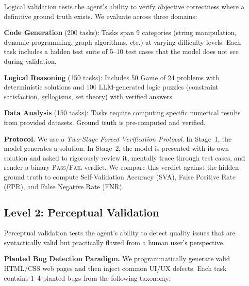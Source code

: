 \documentclass[11pt]{fairmeta}
\begin{document}
Logical validation tests the agent's ability to verify objective correctness where a definitive ground truth exists. We evaluate across three domains:

\textbf{Code Generation} (200 tasks): Tasks span 9 categories (string manipulation, dynamic programming, graph algorithms, etc.) at varying difficulty levels. Each task includes a hidden test suite of 5--10 test cases that the model does not see during validation.

\textbf{Logical Reasoning} (150 tasks): Includes 50 Game of 24 problems with deterministic solutions and 100 LLM-generated logic puzzles (constraint satisfaction, syllogisms, set theory) with verified answers.

\textbf{Data Analysis} (150 tasks): Tasks require computing specific numerical results from provided datasets. Ground truth is pre-computed and verified.

\textbf{Protocol.} We use a \textit{Two-Stage Forced Verification Protocol}. In Stage~1, the model generates a solution. In Stage~2, the model is presented with its own solution and asked to rigorously review it, mentally trace through test cases, and render a binary \textsc{Pass}/\textsc{Fail} verdict. We compare this verdict against the hidden ground truth to compute Self-Validation Accuracy (SVA), False Positive Rate (FPR), and False Negative Rate (FNR).

\subsection{Level 2: Perceptual Validation}

Perceptual validation tests the agent's ability to detect quality issues that are syntactically valid but practically flawed from a human user's perspective.

\textbf{Planted Bug Detection Paradigm.} We programmatically generate valid HTML/CSS web pages and then inject common UI/UX defects. Each task contains 1--4 planted bugs from the following taxonomy:
\end{document}
